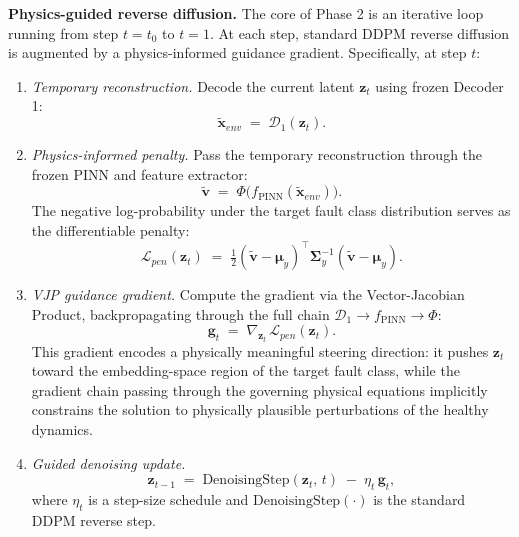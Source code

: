 \documentclass[conference]{IEEEtran}
\newcommand{\DecOne}{\mathcal{D}_1}
\newcommand{\PINN}{f_{\text{PINN}}}
\newcommand{\Feat}{\Phi}
\newcommand{\z}{\mathbf{z}}
\newcommand{\x}{\mathbf{x}}
\newcommand{\bv}{\mathbf{v}}          %
\newcommand{\g}{\mathbf{g}}
\newcommand{\muvec}{\boldsymbol{\mu}}
\newcommand{\Sigmamat}{\boldsymbol{\Sigma}}
\begin{document}
\textbf{Physics-guided reverse diffusion.} The core of Phase 2 is an iterative loop running from step $t=t_0$ to $t=1$. At each step, standard DDPM reverse diffusion is augmented by a physics-informed guidance gradient. Specifically, at step $t$:
\begin{enumerate}
  \item \textit{Temporary reconstruction.}
    Decode the current latent $\z_t$ using frozen Decoder 1:
    \begin{equation}
      \tilde{\x}_{env} \;=\; \DecOne(\z_t).
      \label{eq:temp_recon}
    \end{equation}
  \item \textit{Physics-informed penalty.}
    Pass the temporary reconstruction through the frozen PINN and feature extractor:
    \begin{equation}
      \tilde{\bv} \;=\; \Feat\!\bigl(\PINN(\tilde{\x}_{env})\bigr).
      \label{eq:phys_embed}
    \end{equation}
    The negative log-probability under the target fault class distribution serves as the differentiable penalty:
    \begin{equation}
      \mathcal{L}_{pen}(\z_t) \;=\;
        \tfrac{1}{2}
        (\tilde{\bv}-\muvec_y)^\top
        \Sigmamat_y^{-1}
        (\tilde{\bv}-\muvec_y).
      \label{eq:penalty}
    \end{equation}
  \item \textit{VJP guidance gradient.}
    Compute the gradient via the Vector-Jacobian Product, backpropagating through the full chain $\DecOne\!\to\!\PINN\!\to\!\Feat$:
    \begin{equation}
      \g_t \;=\; \nabla_{\!\z_t}\,\mathcal{L}_{pen}(\z_t).
      \label{eq:vjp}
    \end{equation}
    This gradient encodes a physically meaningful steering direction: it pushes $\z_t$ toward the embedding-space region of the target fault class, while the gradient chain passing through the governing physical equations implicitly constrains the solution to physically plausible perturbations of the healthy dynamics.
  \item \textit{Guided denoising update.}
    \begin{equation}
      \z_{t-1} \;=\;
        \mathrm{DenoisingStep}(\z_t,\,t)
        \;-\;\eta_t\,\g_t,
      \label{eq:guided_step}
    \end{equation}
    where $\eta_t$ is a step-size schedule and $\mathrm{DenoisingStep}(\cdot)$ is the standard DDPM reverse step.
\end{enumerate}
\end{document}
